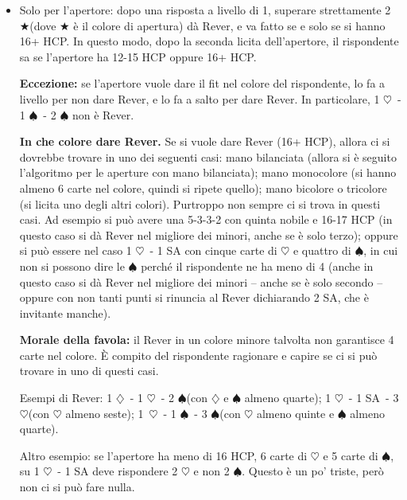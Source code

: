 \documentclass[a4paper,10pt]{article}
\renewcommand{\c}{$\clubsuit$\xspace}
\renewcommand{\d}{$\diamondsuit$\xspace}
\newcommand{\h}{$\heartsuit$\xspace}
\newcommand{\s}{$\spadesuit$\xspace}
\renewcommand{\j}{$\bigstar$\xspace}
\newcommand{\sa}{SA\xspace}
\begin{document}
\begin{itemize}
 Per esempio, se l'apertore ha 4\c\ - 4\d\ - 4\h\ - 1\s e ha aperto di 1 \c (quindi ha 16+ HCP, vedi apertura tricolore), sulla risposta di 1 \d dichiara 2 \h (Rever, \h quarte) e non 3 \d (Rever, fit a \d).
 Il fit a \d può essere dato dopo, nel caso in cui non si trovi fit a \h.
 
 \item Solo per l'apertore: dopo una risposta a livello di 1, superare strettamente 2 \j (dove \j è il colore di apertura) dà Rever, e va fatto se e solo se si hanno 16+ HCP.
 In questo modo, dopo la seconda licita dell'apertore, il rispondente sa se l'apertore ha 12-15 HCP oppure 16+ HCP.
 
 {\bf Eccezione:} se l'apertore vuole dare il fit nel colore del rispondente, lo fa a livello per non dare Rever, e lo fa a salto per dare Rever. In particolare, 1 \h\ - 1 \s\ - 2 \s non è Rever.
 
 {\bf In che colore dare Rever.} Se si vuole dare Rever (16+ HCP), allora ci si dovrebbe trovare in uno dei seguenti casi: mano bilanciata (allora si è seguito l'algoritmo per le aperture con mano bilanciata); mano monocolore (si hanno almeno 6 carte nel colore, quindi si ripete quello); mano bicolore o tricolore (si licita uno degli altri colori). Purtroppo non sempre ci si trova in questi casi.
 Ad esempio si può avere una 5-3-3-2 con quinta nobile e 16-17 HCP (in questo caso si dà Rever nel migliore dei minori, anche se è solo terzo);
 oppure si può essere nel caso 1 \h\ - 1 \sa con cinque carte di \h e quattro di \s, in cui non si possono dire le \s perché il rispondente ne ha meno di 4 (anche in questo caso si dà Rever nel migliore dei minori -- anche se è solo secondo -- oppure con non tanti punti si rinuncia al Rever dichiarando 2 \sa, che è invitante manche).
 
 {\bf Morale della favola:} il Rever in un colore minore talvolta non garantisce 4 carte nel colore. È compito del rispondente ragionare e capire se ci si può trovare in uno di questi casi.
 
 Esempi di Rever: 1 \d\ - 1 \h\ - 2 \s (con \d e \s almeno quarte); 1 \h\ - 1 \sa\ - 3 \h (con \h almeno seste); \hbox{1 \h}\ - 1 \s\ - 3 \s (con \h almeno quinte e \s almeno quarte).
 
 Altro esempio: se l'apertore ha meno di 16 HCP, 6 carte di \h e 5 carte di \s, su 1 \h\ - 1 \sa deve rispondere 2 \h e non 2 \s. Questo è un po' triste, però non ci si può fare nulla.

\end{itemize}
\end{document}
